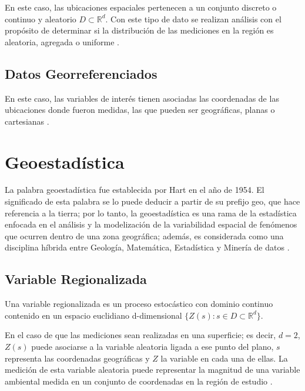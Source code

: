 \documentclass[
]{book}
\begin{document}
En este caso, las ubicaciones espaciales pertenecen a un conjunto discreto o continuo y aleatorio \(D\subset \mathbb{R}^d\). Con este tipo de dato se realizan análisis con el propósito de determinar si la distribución de las mediciones en la región es aleatoria, agregada o uniforme \citep{Ramon}.

\hypertarget{datos-georreferenciados}{%
\subsection{Datos Georreferenciados}\label{datos-georreferenciados}}

En este caso, las variables de interés tienen asociadas las coordenadas de las ubicaciones donde fueron medidas, las que pueden ser geográficas, planas o cartesianas \citep{Ramon}.

\hypertarget{geoestaduxedstica-1}{%
\section{Geoestadística}\label{geoestaduxedstica-1}}

La palabra geoestadística fue establecida por Hart en el año de 1954. El significado de esta palabra se lo puede deducir a partir de su prefijo geo, que hace referencia a la tierra; por lo tanto, la geoestadística es una rama de la estadística enfocada en el análisis y la modelización de la variabilidad espacial de fenómenos que ocurren dentro de una zona geográfica; además, es considerada como una disciplina híbrida entre Geología, Matemática, Estadística y Minería de datos \citep{Cressi}.

\hypertarget{variable-regionalizada}{%
\subsection{Variable Regionalizada}\label{variable-regionalizada}}

Una variable regionalizada es un proceso estocástico con dominio continuo contenido en un espacio euclidiano d-dimensional \(\{Z(s):s\in D\subset \mathbb{R}^d\}\).

En el caso de que las mediciones sean realizadas en una superficie; es decir, \(d=2\), \(Z(s)\) puede asociarse a la variable aleatoria ligada a ese punto del plano, \(s\) representa las coordenadas geográficas y \(Z\) la variable en cada una de ellas. La medición de esta variable aleatoria puede representar la magnitud de una variable ambiental medida en un conjunto de coordenadas en la región de estudio \citep{Ramon}.
\end{document}
